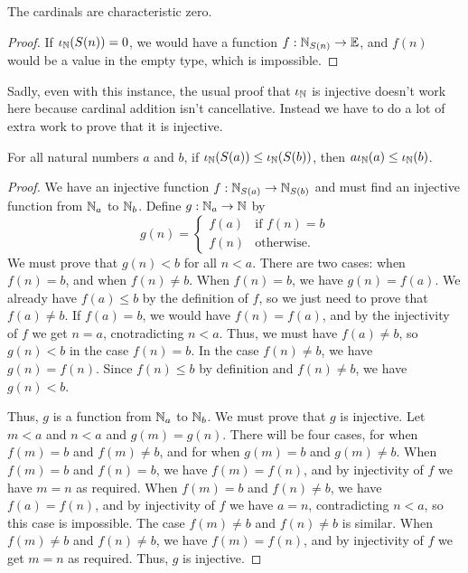 \documentclass[../../math.tex]{subfiles}
\begin{document}
\begin{instance}
    The cardinals are characteristic zero.
\end{instance}
\begin{proof}
    If $\iota_{\mathbb{N}}(S(n)) = 0$, we would have a function $f : \mathbb{N}_{S(n)} \to \mathbb{E}$, and
    $f(n)$ would be a value in the empty type, which is impossible.
\end{proof}

Sadly, even with this instance, the usual proof that $\iota_{\mathbb{N}}$ is injective doesn't
work here because cardinal addition isn't cancellative.  Instead we have to do a
lot of extra work to prove that it is injective.

\begin{lemma} \label{from_nat_card_inj_lemma}
    For all natural numbers $a$ and $b$, if $\iota_{\mathbb{N}}(S(a)) \leq \iota_{\mathbb{N}}(S(b))$, then $a
    \iota_{\mathbb{N}}(a) \leq \iota_{\mathbb{N}}(b)$.
\end{lemma}
\begin{proof}
    We have an injective function $f : \mathbb{N}_{S(a)} \to \mathbb{N}_{S(b)}$ and must find an
    injective function from $\mathbb{N}_a$ to $\mathbb{N}_b$.  Define $g : \mathbb{N}_a \to \mathbb{N}$ by
    \[
        g(n) =
        \begin{cases}
            f(a) & \text{if $f(n) = b$} \\
            f(n) & \text{otherwise.}
        \end{cases}
    \]
    We must prove that $g(n) < b$ for all $n < a$.  There are two cases: when
    $f(n) = b$, and when $f(n) \neq b$.  When $f(n) = b$, we have $g(n) = f(a)$.
    We already have $f(a) \leq b$ by the definition of $f$, so we just need to
    prove that $f(a) \neq b$.  If $f(a) = b$, we would have $f(n) = f(a)$, and
    by the injectivity of $f$ we get $n = a$, cnotradicting $n < a$.  Thus, we
    must have $f(a) \neq b$, so $g(n) < b$ in the case $f(n) = b$.  In the case
    $f(n) \neq b$, we have $g(n) = f(n)$.  Since $f(n) \leq b$ by definition and
    $f(n) \neq b$, we have $g(n) < b$.

    Thus, $g$ is a function from $\mathbb{N}_a$ to $\mathbb{N}_b$.  We must prove that $g$ is
    injective.  Let $m < a$ and $n < a$ and $g(m) = g(n)$.  There will be four
    cases, for when $f(m) = b$ and $f(m) \neq b$, and for when $g(m) = b$ and
    $g(m) \neq b$.  When $f(m) = b$ and $f(n) = b$, we have $f(m) = f(n)$, and
    by injectivity of $f$ we have $m = n$ as required.  When $f(m) = b$ and
    $f(n) \neq b$, we have $f(a) = f(n)$, and by injectivity of $f$ we have $a =
    n$, contradicting $n < a$, so this case is impossible.  The case $f(m) \neq
    b$ and $f(n) \neq b$ is similar.  When $f(m) \neq b$ and $f(n) \neq b$, we
    have $f(m) = f(n)$, and by injectivity of $f$ we get $m = n$ as required.
    Thus, $g$ is injective.
\end{proof}
\end{document}
